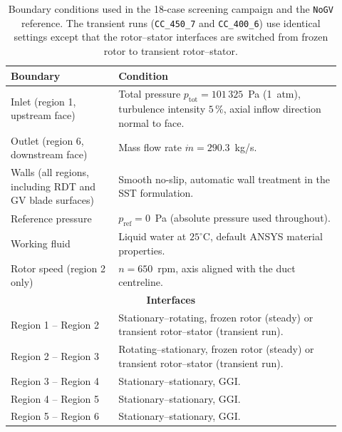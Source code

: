 \begin{table}[h!]
  \centering
  \caption[Boundary conditions for the screening simulations]{Boundary conditions used in the 18-case screening campaign and the \texttt{NoGV} reference. The transient runs (\texttt{CC\_450\_7} and \texttt{CC\_400\_6}) use identical settings except that the rotor--stator interfaces are switched from frozen rotor to transient rotor--stator.}
  \label{tab:bc_master}
  \small
  \begin{tabular}{p{0.30\linewidth} p{0.62\linewidth}}
    \toprule
    \textbf{Boundary} & \textbf{Condition} \\
    \midrule
    Inlet (region 1, upstream face)
        & Total pressure $p_{\mathrm{tot}} = 101\,325$~Pa (1~atm),
          turbulence intensity $5\,\%$, axial inflow direction normal to face. \\
    Outlet (region 6, downstream face)
        & Mass flow rate $\dot m = 290.3$~kg/s. \\
    Walls (all regions, including RDT and GV blade surfaces)
        & Smooth no-slip, automatic wall treatment in the SST formulation. \\
    Reference pressure
        & $p_{\mathrm{ref}} = 0$~Pa (absolute pressure used throughout). \\
    Working fluid
        & Liquid water at $25^\circ$C, default ANSYS material properties. \\
    Rotor speed (region 2 only)
        & $n = 650$~rpm, axis aligned with the duct centreline. \\
    \midrule
    \multicolumn{2}{c}{\textbf{Interfaces}} \\
    \midrule
    Region 1 -- Region 2
        & Stationary--rotating, frozen rotor (steady) or transient rotor--stator (transient run). \\
    Region 2 -- Region 3
        & Rotating--stationary, frozen rotor (steady) or transient rotor--stator (transient run). \\
    Region 3 -- Region 4
        & Stationary--stationary, GGI. \\
    Region 4 -- Region 5
        & Stationary--stationary, GGI. \\
    Region 5 -- Region 6
        & Stationary--stationary, GGI. \\
    \bottomrule
  \end{tabular}
\end{table}
 
